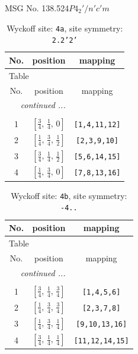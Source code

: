 \documentclass[fleqn,8pt]{jsarticle}
\begin{document}
\setcounter{MaxMatrixCols}{32}

\renewcommand{\tablename}{Table~}
\renewcommand{\figurename}{Figure~}
\begin{center}
\LARGE
MSG No. 138.524\quad$P4_{2}'/n'c'm$
\end{center}
\renewcommand{\arraystretch}{1.2}
\begin{longtable}{ccc}
\caption{Wyckoff site: {\tt 4a}, site symmetry: {\tt 2.2'2'}}
 \\
 \hline \hline
No. & position & mapping \\ \hline \endfirsthead

\multicolumn{2}{l}{\tablename\ \thetable{}} \\
 \hline \hline
No. & position & mapping \\ \hline \endhead

 \hline \hline
\multicolumn{2}{r}{\footnotesize\it continued ...} \\ \endfoot

 \hline \hline
\multicolumn{2}{r}{} \\ \endlastfoot

1 & $\left[ \frac{3}{4},\, \frac{1}{4},\, 0 \right]$ & {\tt [1,4,11,12]} \\ \hline
2 & $\left[ \frac{1}{4},\, \frac{3}{4},\, \frac{1}{2} \right]$ & {\tt [2,3,9,10]} \\ \hline
3 & $\left[ \frac{3}{4},\, \frac{1}{4},\, \frac{1}{2} \right]$ & {\tt [5,6,14,15]} \\ \hline
4 & $\left[ \frac{1}{4},\, \frac{3}{4},\, 0 \right]$ & {\tt [7,8,13,16]} \\
\end{longtable}
\renewcommand{\arraystretch}{1.2}
\begin{longtable}{ccc}
\caption{Wyckoff site: {\tt 4b}, site symmetry: {\tt -4..}}
 \\
 \hline \hline
No. & position & mapping \\ \hline \endfirsthead

\multicolumn{2}{l}{\tablename\ \thetable{}} \\
 \hline \hline
No. & position & mapping \\ \hline \endhead

 \hline \hline
\multicolumn{2}{r}{\footnotesize\it continued ...} \\ \endfoot

 \hline \hline
\multicolumn{2}{r}{} \\ \endlastfoot

1 & $\left[ \frac{3}{4},\, \frac{1}{4},\, \frac{3}{4} \right]$ & {\tt [1,4,5,6]} \\ \hline
2 & $\left[ \frac{1}{4},\, \frac{3}{4},\, \frac{3}{4} \right]$ & {\tt [2,3,7,8]} \\ \hline
3 & $\left[ \frac{1}{4},\, \frac{3}{4},\, \frac{1}{4} \right]$ & {\tt [9,10,13,16]} \\ \hline
4 & $\left[ \frac{3}{4},\, \frac{1}{4},\, \frac{1}{4} \right]$ & {\tt [11,12,14,15]} \\
\end{longtable}
\end{document}
